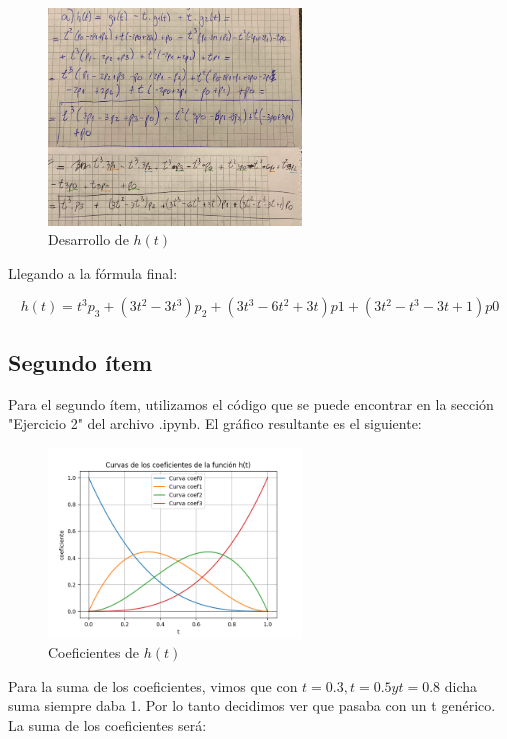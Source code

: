 \documentclass{article}
\begin{document}
\begin{figure}[H]
    \centering
    \includegraphics[width=0.6\textwidth]{imagenes/2a.png}
    \caption{Desarrollo de $h(t)$}
    \label{fig:ejemplo}
\end{figure}

Llegando a la fórmula final:

$$
h(t) = t^3p_3 + (3t^2-3t^3)p_2 + (3t^3-6t^2+3t)p1 + (3t^2-t^3-3t+1)p0
$$

\subsection*{Segundo ítem}
Para el segundo ítem, utilizamos el código que se puede encontrar en la sección "Ejercicio 2" del archivo .ipynb. El gráfico resultante es el siguiente:

\begin{figure}[H]
    \centering
    \includegraphics[width=0.6\textwidth]{imagenes/graf_2a.png}
    \caption{Coeficientes de $h(t)$}
    \label{fig:ejemplo}
\end{figure}

Para la suma de los coeficientes, vimos que con $t=0.3, t=0.5 y t=0.8$ dicha suma siempre daba 1. Por lo tanto decidimos ver que pasaba con un t genérico. La suma de los coeficientes será:
\end{document}
